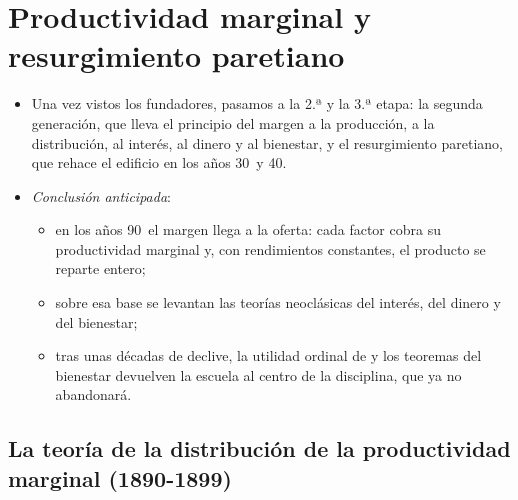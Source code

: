 \documentclass[11pt]{article}
\begin{document}
\section{Productividad marginal y resurgimiento paretiano}\label{sec:segunda}

\begin{itemize}
\item Una vez vistos los fundadores, pasamos a la 2.ª y la 3.ª etapa: la segunda generación, que lleva el principio del margen a la producción, a la distribución, al interés, al dinero y al bienestar, y el resurgimiento paretiano, que rehace el edificio en los años 30~y 40.
\item \emph{Conclusión anticipada}:
  \begin{itemize}
  \item en los años 90~el margen llega a la oferta: cada factor cobra su productividad marginal y, con rendimientos constantes, el producto se reparte entero;
  \item sobre esa base se levantan las teorías neoclásicas del interés, del dinero y del bienestar;
  \item tras unas décadas de declive, la utilidad ordinal de  y los teoremas del bienestar devuelven la escuela al centro de la disciplina, que ya no abandonará.
  \end{itemize}
\end{itemize}

\subsection{La teoría de la distribución de la productividad marginal (1890-1899)}\label{sec:productividad}
\end{document}

